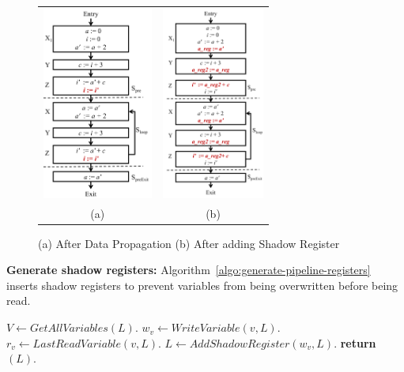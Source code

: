 \begin{figure}[t!]
\begin{center}
\begin{tabular}{cc}
\includegraphics[height=2.5in]{fig-proposal/algorithm-after-data-propagation-2}
&
\includegraphics[height=2.5in]{fig-proposal/algorithm-after-shadow-register}
\\
(a) & (b)
\\
\end{tabular}
\end{center}
\caption{(a) After Data Propagation (b) After adding Shadow Register}
\label{fig:algo2-2}
\end{figure}

{\bf Generate shadow registers:} Algorithm~\ref{algo:generate-pipeline-registers} inserts shadow registers
to prevent variables from being overwritten before being read. 

\begin{algorithm}[H]
\caption{Generate shadow registers} 
\label{algo:generate-pipeline-registers}
\begin{algorithmic}[1]
\State $V \leftarrow GetAllVariables(L)$.
\State $w_v \leftarrow WriteVariable (v, L)$.
\State $r_v \leftarrow LastReadVariable (v, L)$.
\State $L \leftarrow AddShadowRegister (w_v, L)$.
\EndIf
\EndFor
\State \textbf{return} $(L)$.
\EndProcedure
\end{algorithmic}
\end{algorithm}

